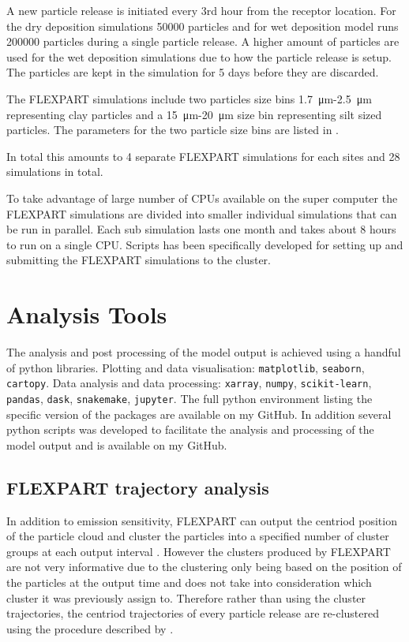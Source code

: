 A new particle release is initiated every 3rd hour from the receptor location. For the dry deposition simulations 50000 particles and for wet deposition model runs 200000 particles during a single particle release. A higher amount of particles are used for the wet deposition simulations due to how the particle release is setup. The particles are kept in the simulation for 5 days before they are discarded. 

The FLEXPART simulations include two particles size bins \SI{1.7}{\micro\metre}-\SI{2.5}{\micro\metre} representing clay particles and a \SI{15}{\micro\metre}-\SI{20}{\micro\metre} size bin representing silt sized particles. The parameters for the two particle size bins are listed in . 

In total this amounts to 4 separate FLEXPART simulations for each sites and 28 simulations in total. 

To take advantage of large number of CPUs available on the super computer the FLEXPART simulations are divided into smaller individual simulations that can be run in parallel. Each sub simulation lasts one month and takes about 8 hours to run on a single CPU. Scripts has been specifically developed for setting up and submitting the FLEXPART simulations to the cluster. 

\section{Analysis Tools}
The analysis and post processing of the model output is achieved using a handful of python libraries. Plotting and data visualisation:  \verb|matplotlib|, \verb|seaborn|, \verb|cartopy|. Data analysis and data processing: \verb|xarray|, \verb|numpy|, \verb|scikit-learn|, \verb|pandas|, \verb|dask|, \verb|snakemake|, \verb|jupyter|. The full python environment listing the specific version of the packages are available on my GitHub. In addition several python scripts was developed to facilitate the analysis and processing of the model output and is available on my GitHub.        

\subsection{FLEXPART trajectory analysis}
In addition to emission sensitivity, FLEXPART can output the centriod position of the particle cloud and cluster the particles into a specified number of cluster groups at each output interval \parencite{stohl_replacement_2002}. However the clusters produced by FLEXPART are not very informative due to the clustering only being based on the position of the particles at the output time and does not take into consideration which cluster it was previously assign to. Therefore rather than using the cluster trajectories, the centriod trajectories of every particle release are re-clustered using the procedure described by \textcite{dorling1992cluster}. 


